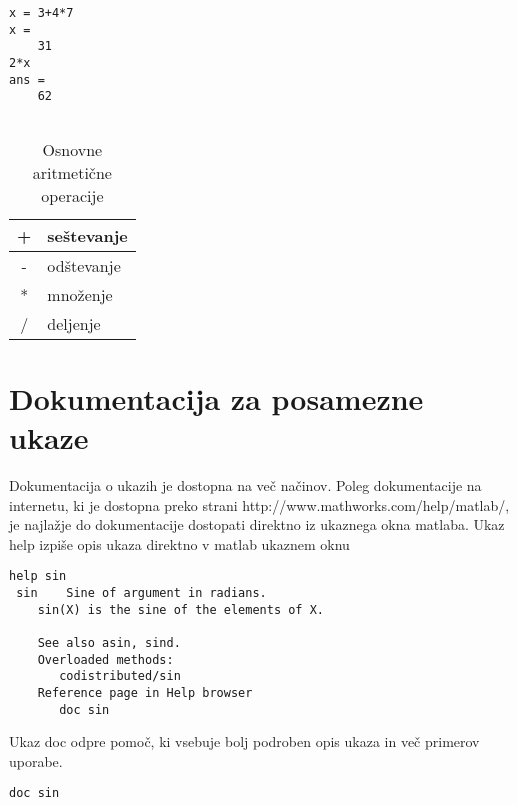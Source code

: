 \begin{lstlisting}
x = 3+4*7
x =
    31
2*x
ans =
    62
    
\end{lstlisting}



\begin {table}[htb]
\caption{Osnovne aritmetične operacije}
\vspace{0.5cm}
\begin{tabular}{|c|l|}
\hline   + &  seštevanje \\
\hline   - &  odštevanje \\
\hline   * &  množenje \\
\hline   / &  deljenje \\
\hline
\end{tabular}
\end {table}

\section{Dokumentacija za posamezne ukaze}

Dokumentacija o ukazih je dostopna na več načinov. Poleg dokumentacije na internetu, ki je dostopna preko strani http://www.mathworks.com/help/matlab/, je najlažje do dokumentacije dostopati direktno iz ukaznega okna matlaba. Ukaz help izpiše opis ukaza direktno v matlab ukaznem oknu
\begin{lstlisting}
help sin
 sin    Sine of argument in radians.
    sin(X) is the sine of the elements of X.

    See also asin, sind.
    Overloaded methods:
       codistributed/sin
    Reference page in Help browser
       doc sin
\end{lstlisting}

Ukaz doc odpre pomoč, ki vsebuje bolj podroben opis ukaza in več primerov uporabe.

\begin{lstlisting}
doc sin
\end{lstlisting}

